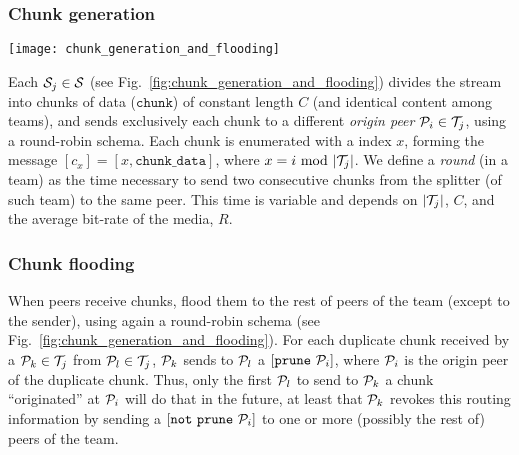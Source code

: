 \begin{comment}
calls the Procedure \emph{Joining a
  team} (for $K=1$), to find a new neighbor. Finally, ${\cal S}_j$
sends to ${\cal P}_o$ a $[\mathtt{goodbye}]$ and performs ${\cal T}_j
= {\cal T}_j \setminus \{{\cal P}_o\}$.
\end{comment}

\subsubsection{Chunk generation}
\label{dbs:chunk_generation}
\begin{figure*}
  \texttt{[image: chunk\_generation\_and\_flooding]}
  \caption{Chunk generation and
    flooding.\label{fig:chunk_generation_and_flooding}}
\end{figure*}
Each ${\cal S}_j\in{\cal S}$ (see
Fig.~\ref{fig:chunk_generation_and_flooding}) divides the stream into
chunks of data ($\mathtt{chunk}$) of constant length $C$ (and
identical content among teams), and sends exclusively each chunk to a
different \emph{origin peer} ${\cal P}_i\in{\cal T}_j$, using a
round-robin schema. Each chunk is enumerated with a index $x$, forming
the message $[c_x]=[x,\mathtt{chunk\_data}]$, where
$x=i~\mathrm{mod}~|{\cal T}_j|$. We define a \emph{round} (in a team)
as the time necessary to send two consecutive chunks from the splitter
(of such team) to the same peer. This time is variable and depends on
$|{\cal T}_j|$, $C$, and the average bit-rate of the media, $R$.

\begin{comment}
The round-time is defined by:
\begin{equation}
  \cal{r} = \cal{c}N.
  \label{eq:round_time}
\end{equation}
For example, if we use only one team of $N=256$ peers, a chunk size
$C=1024$~bytes, and a video of $1$~Mb/s, the round time is
\begin{displaymath}
  \cal{r} = \frac{1024\frac{\text{bytes}}{\text{chunk}}\times
    8\frac{\text{bits}}{\text{byte}}}{10^6\frac{\text{bits}}{\text{second}}}\times
  256 \approx 2.1~\text{seconds}.
\end{displaymath}
\end{comment}

\subsubsection{Chunk flooding}
\label{dbs:chunk_flooding}
When peers receive chunks, flood them to the rest of peers of the team
(except to the sender), using again a round-robin schema (see
Fig.~\ref{fig:chunk_generation_and_flooding}). For each duplicate
chunk received by a ${\cal P}_k \in {\cal T}_j$ from ${\cal P}_l \in
{\cal T}_j$, ${\cal P}_k$ sends to ${\cal P}_l$ a
$[\mathtt{prune}~{\cal P}_i]$, where ${\cal P}_i$ is the origin peer
of the duplicate chunk. Thus, only the first ${\cal P}_l$ to send to
${\cal P}_k$ a chunk ``originated'' at ${\cal P}_i$ will do that in
the future, at least that ${\cal P}_k$ revokes this routing
information by sending a $[\mathtt{not~prune}~{\cal P}_i]$ to one or
more (possibly the rest of) peers of the team.

